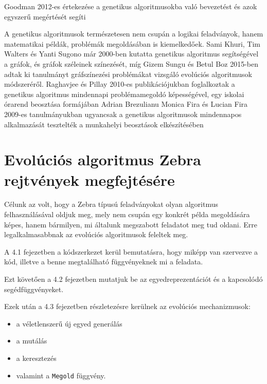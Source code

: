 \documentclass[12pt,a4paper,oneside]{report}
\begin{document}
Goodman 2012-es értekezése a genetikus algoritmusokba való bevezetést és azok egyszerű megértését segíti\cite{Goodman:2012:IGA:2330784.2330911}

A genetikus algoritmusok természetesen nem csupán a logikai feladványok, hanem matematikai példák, problémák megoldásában is kiemelkedőek. Sami Khuri, Tim Walters és Yanti Sugono már 2000-ben kutatta genetikus algoritmus segítségével a gráfok, és gráfok széleinek színezését\cite{Khuri:2000:GGA:335603.335880}, míg Gizem Sungu és Betul Boz 2015-ben adtak ki tanulmányt gráfszínezési problémákat vizsgáló evolúciós algoritmusok módszeréről\cite{Sungu:2015:EAW:2739482.2768488}.
Raghavjee és Pillay 2010-es publikációjukban foglalkoztak a genetikus algoritmus mindennapi problémamegoldó képességével, egy iskolai órarend beosztása formájában\cite{Raghavjee:2010:IGA:1899503.1899555}
Adrian Brezulianu Monica Fira és Lucian Fira 2009-es tanulmányukban ugyancsak a genetikus algoritmusok mindennapos alkalmazását tesztelték a munkahelyi beosztások elkészítésében\cite{Brezulianu:2009:GAA:1644993.1645085}




\chapter{Evolúciós algoritmus Zebra rejtvények megfejtésére} %
	Célunk az volt, hogy a Zebra típusú feladványokat olyan algoritmus felhasználásával oldjuk meg, mely nem csupán egy konkrét példa megoldására képes, hanem bármilyen, mi általunk megszabott feladatot meg tud oldani.
    Erre legalkalmasabbnak az evolúciós algoritmusok feleltek meg.

	{A 4.1 fejezetben a kódszerkezet kerül bemutatásra, hogy miképp van szervezve a kód, illetve a benne megtalálható függvényeknek mi a feladata.}

	{Ezt követően a 4.2 fejezetben mutatjuk be az egyedreprezentációt és a kapcsolódó segédfüggvényeket.}

	{Ezek után a 4.3 fejezetben részletezésre kerülnek az evolúciós mechanizmusok:}

	\begin{itemize}
	\item a véletlenszerű új egyed generálás
	\item a mutálás
	\item a keresztezés
	\item  valamint a \texttt{Megold} függvény.
	\end{itemize}
\end{document}
